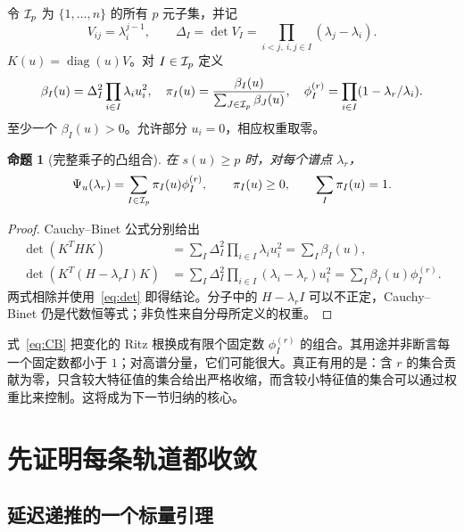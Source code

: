 \documentclass[UTF8,zihao=-4,a4paper]{ctexart}
\newtheorem{proposition}[theorem]{命题}
\theoremstyle{definition}\newtheorem{example}[theorem]{例}
\DeclareMathOperator{\diag}{diag}\DeclareMathOperator{\Span}{span}\DeclareMathOperator{\rank}{rank}
\begin{document}
令 $\mathcal I_p$ 为 $\{1,\ldots,n\}$ 的所有 $p$ 元子集，并记
\[
 V_{ij}=\lambda_i^{j-1},\qquad
 \Delta_I=\det V_I=\prod_{i<j,\ i,j\in I}(\lambda_j-\lambda_i).
\]
$K(u)=\diag(u)V$。对 $I\in\mathcal I_p$ 定义
\begin{equation}\label{eq:weights}
 \beta_I(u)=\Delta_I^2\prod_{i\in I}\lambda_i u_i^2,
 \quad \pi_I(u)=\frac{\beta_I(u)}{\sum_{J\in\mathcal I_p}\beta_J(u)},
 \quad \phi_I^{(r)}=\prod_{i\in I}(1-\lambda_r/\lambda_i).
\end{equation}
至少一个 $\beta_I(u)>0$。允许部分 $u_i=0$，相应权重取零。

\begin{proposition}[完整乘子的凸组合]\label{prop:CB}
在 $s(u)\ge p$ 时，对每个谱点 $\lambda_r$，
\begin{equation}\label{eq:CB}
 \Psi_u(\lambda_r)=\sum_{I\in\mathcal I_p}\pi_I(u)\phi_I^{(r)},
 \qquad \pi_I(u)\ge0,\qquad\sum_I\pi_I(u)=1.
\end{equation}
\end{proposition}
\begin{proof}
Cauchy--Binet 公式分别给出
\begin{align*}
 \det(K^THK)&=\sum_I\Delta_I^2\prod_{i\in I}\lambda_i u_i^2
             =\sum_I\beta_I(u),\\
 \det(K^T(H-\lambda_rI)K)
 &=\sum_I\Delta_I^2\prod_{i\in I}(\lambda_i-\lambda_r)u_i^2
   =\sum_I\beta_I(u)\phi_I^{(r)}.
\end{align*}
两式相除并使用~\eqref{eq:det} 即得结论。分子中的 $H-\lambda_rI$ 可以不正定，Cauchy--Binet 仍是代数恒等式；非负性来自分母所定义的权重。
\end{proof}

式~\eqref{eq:CB} 把变化的 Ritz 根换成有限个固定数 $\phi_I^{(r)}$ 的组合。其用途并非断言每一个固定数都小于 $1$；对高谱分量，它们可能很大。真正有用的是：含 $r$ 的集合贡献为零，只含较大特征值的集合给出严格收缩，而含较小特征值的集合可以通过权重比来控制。这将成为下一节归纳的核心。

\section{先证明每条轨道都收敛}

\subsection{延迟递推的一个标量引理}
\end{document}
